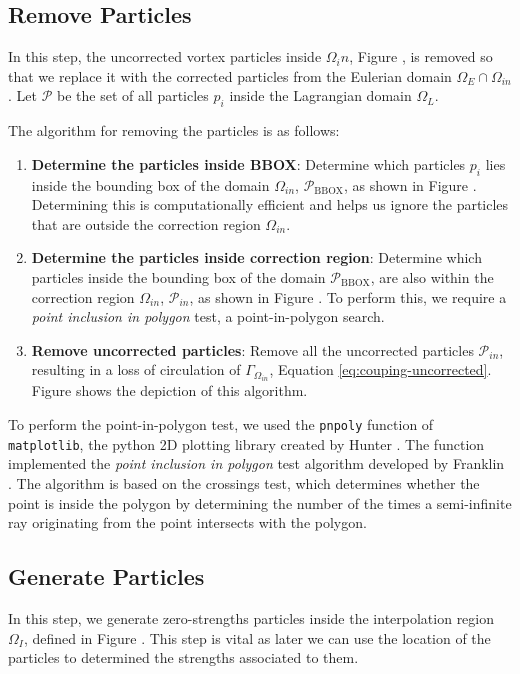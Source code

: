 	\subsection{Remove Particles}
	In this step, the uncorrected vortex particles inside $\Omega_in$, Figure , is removed so that we replace it with the corrected particles from the Eulerian domain $\Omega_E \cap \Omega_{in}$. Let $\mathcal{P}$ be the set of all particles $p_i$ inside the Lagrangian domain $\Omega_L$.
	
	The algorithm for removing the particles is as follows:
	\begin{enumerate}[label=2.\alph*)]
	\item \textbf{Determine the particles inside BBOX}: Determine which particles $p_i$ lies inside the bounding box of the domain $\Omega_{in}$, $\mathcal{P}_{\mathrm{BBOX}}$, as shown in Figure . Determining this is computationally efficient and helps us ignore the particles that are outside the correction region $\Omega_{in}$.
	\item \textbf{Determine the particles inside correction region}: Determine which particles inside the bounding box of the domain $\mathcal{P}_{\mathrm{BBOX}}$, are also within the correction region $\Omega_{in}$, $\mathcal{P}_{in}$, as shown in Figure . To perform this, we require a \textit{point inclusion in polygon} test, a point-in-polygon search.
	\item \textbf{Remove uncorrected particles}: Remove all the uncorrected particles $\mathcal{P}_{in}$, resulting in a loss of circulation of $\Gamma_{\Omega_{in}}$, Equation \ref{eq:couping-uncorrected}. Figure  shows the depiction of this algorithm. 
	\end{enumerate}	
	
	To perform the point-in-polygon test, we used the \texttt{pnpoly} function of \texttt{matplotlib}, the python 2D plotting library created by Hunter \cite{Hunter:2007}. The function implemented the \textit{point inclusion in polygon} test algorithm developed by Franklin \cite{franklin2006pnpoly}. The algorithm is based on the crossings test, which determines whether the point is inside the polygon by determining the number of the times a semi-infinite ray originating from the point intersects with the polygon.
	
	\subsection{Generate Particles}
	In this step, we generate zero-strengths particles inside the interpolation region $\Omega_I$, defined in Figure . This step is vital as later we can use the location of the particles to determined the strengths associated to them. 
	
